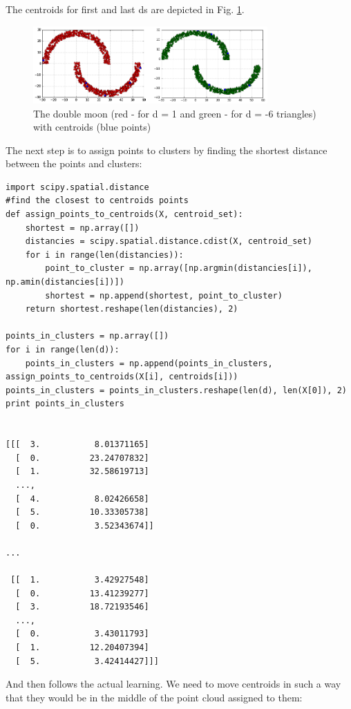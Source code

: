 \documentclass[a4paper, 12pt]{article}
\begin{document}
The centroids for first and last ds are depicted in Fig. \ref{fig:centr}.

\begin{figure}[h]
  \centering
  \caption{The double moon (red - for d = 1 and green - for d = -6 triangles) with centroids (blue points) \label{fig:centr}}
  \includegraphics[width=0.8\textwidth]{centr}
\end{figure}

The next step is to assign points to clusters by finding the shortest distance between the points and clusters:
\begin{lstlisting}
import scipy.spatial.distance
#find the closest to centroids points
def assign_points_to_centroids(X, centroid_set):
    shortest = np.array([])
    distancies = scipy.spatial.distance.cdist(X, centroid_set)
    for i in range(len(distancies)):
        point_to_cluster = np.array([np.argmin(distancies[i]), np.amin(distancies[i])])
        shortest = np.append(shortest, point_to_cluster)
    return shortest.reshape(len(distancies), 2)

points_in_clusters = np.array([])
for i in range(len(d)):
    points_in_clusters = np.append(points_in_clusters, assign_points_to_centroids(X[i], centroids[i]))
points_in_clusters = points_in_clusters.reshape(len(d), len(X[0]), 2)
print points_in_clusters


[[[  3.           8.01371165]
  [  0.          23.24707832]
  [  1.          32.58619713]
  ..., 
  [  4.           8.02426658]
  [  5.          10.33305738]
  [  0.           3.52343674]]

...

 [[  1.           3.42927548]
  [  0.          13.41239277]
  [  3.          18.72193546]
  ..., 
  [  0.           3.43011793]
  [  1.          12.20407394]
  [  5.           3.42414427]]]
\end{lstlisting}

And then follows the actual learning. We need to move centroids in such a way that they would 	be in the middle of the point cloud assigned to them:\\
\end{document}
